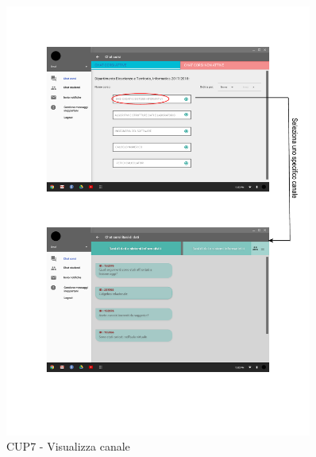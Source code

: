\begin{figure}
	\centering
	\includegraphics[width=0.9\textwidth]{imgs/gruppo6/activities/act_cup7_visualizza_canale.pdf}
	\caption{CUP7 - Visualizza canale}
	\label{fig:act-cup7}
\end{figure}

